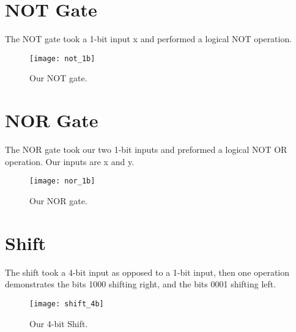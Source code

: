 \documentclass[
	letterpaper, %
	10pt, %
]{CSUniSchoolLabReport}
\begin{document}
\section{NOT Gate}
The NOT gate took a 1-bit input x and performed a logical NOT operation. 

\begin{figure}[H] %
	\texttt{[image: not\_1b]} %
	\caption{Our NOT gate.}
\end{figure}


\section{NOR Gate}
The NOR gate took our two 1-bit inputs and preformed a logical NOT OR operation. Our inputs are x and y.

\begin{figure}[H] %
	\texttt{[image: nor\_1b]} %
	\caption{Our NOR gate.}
\end{figure}


\section{Shift}
The shift took a 4-bit input as opposed to a 1-bit input, then one operation demonstrates the bits 1000 shifting right, and the bits 0001 shifting left.

\begin{figure}[H] %
	\texttt{[image: shift\_4b]} %
	\caption{Our 4-bit Shift.}
\end{figure}

\end{document}
